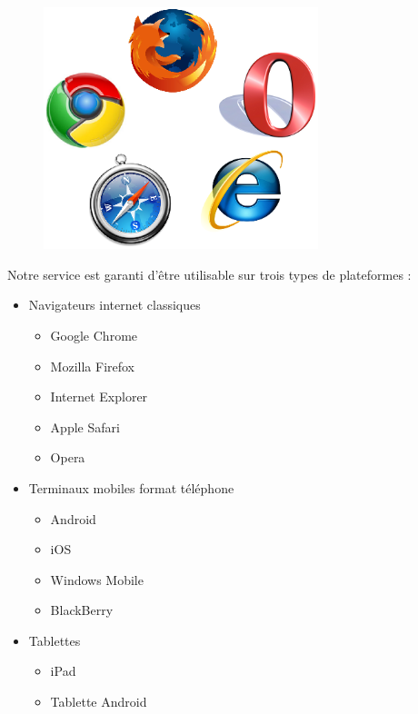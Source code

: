 \documentclass{life-fr}
\begin{document}
\begin{figure}[H]
  \begin{center}
    \includegraphics[width=8cm]{img/navigateurs.png}
  \end{center}
\end{figure}

Notre service est garanti d'être utilisable sur trois types de plateformes :

\begin{itemize}
  \item Navigateurs internet classiques
    \begin{itemize}
      \item Google Chrome
      \item Mozilla Firefox
      \item Internet Explorer
      \item Apple Safari
      \item Opera
    \end{itemize}
  \item Terminaux mobiles format téléphone
    \begin{itemize}
      \item Android
      \item iOS
      \item Windows Mobile
      \item BlackBerry
    \end{itemize}
  \item Tablettes
    \begin{itemize}
      \item iPad
      \item Tablette Android
    \end{itemize}
\end{itemize}
\end{document}
